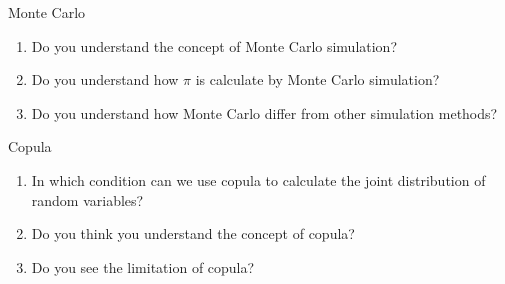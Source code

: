 \documentclass{article}
\theoremstyle{definition}
\theoremstyle{remark}
\begin{document}
\begin{problem}
    {Monte Carlo}{}
    \begin{enumerate}
        \item Do you understand the concept of Monte Carlo simulation? \myrule{}
        \item Do you understand how $\pi$ is calculate by Monte Carlo simulation? \myrule{}
        \item Do you understand how Monte Carlo differ from other simulation methods? \\ \myrule{}
    \end{enumerate}
\end{problem}

\begin{problem}
    {Copula}{}
    \begin{enumerate}
        \item In which condition can we use copula to calculate the joint distribution of random variables? \myrule{}
        \item Do you think you understand the concept of copula? \myrule{}
        \item Do you see the limitation of copula? \myrule{}
    \end{enumerate}
\end{problem}
\end{document}
